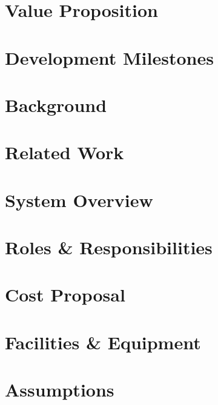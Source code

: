 \documentclass{article}
\begin{document}
\section{Value Proposition}


\section{Development Milestones}


\newpage


\section{Background}


\section{Related Work}


\section{System Overview}


\section{Roles \& Responsibilities}


\section{Cost Proposal}


\section{Facilities \& Equipment}


\section{Assumptions}

\end{document}
